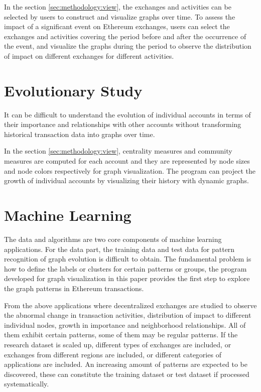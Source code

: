 In the section \ref{sec:methodology:view}, the exchanges and activities can be selected by users to construct and visualize graphs over time. To assess the impact of a significant event on Ethereum exchanges, users can select the exchanges and activities covering the period before and after the occurrence of the event, and visualize the graphs during the period to observe the distribution of impact on different exchanges for different activities. 

\section{Evolutionary Study}
\label{sec:applications:evolutionary}

It can be difficult to understand the evolution of individual accounts in terms of their importance and relationships with other accounts without transforming historical transaction data into graphs over time.

In the section \ref{sec:methodology:view}, centrality measures and community measures are computed for each account and they are represented by node sizes and node colors respectively for graph visualization. The program can project the growth of individual accounts by visualizing their history with dynamic graphs.

\section{Machine Learning}
\label{sec:applications:learning}

The data and algorithms are two core components of machine learning applications. For the data part, the training data and test data for pattern recognition of graph evolution is difficult to obtain. The fundamental problem is how to define the labels or clusters for certain patterns or groups, the program developed for graph visualization in this paper provides the first step to explore the graph patterns in Ethereum transactions.

From the above applications where decentralized exchanges are studied to observe the abnormal change in transaction activities, distribution of impact to different individual nodes, growth in importance and neighborhood relationships. All of them exhibit certain patterns, some of them may be regular patterns. If the research dataset is scaled up, different types of exchanges are included, or exchanges from different regions are included, or different categories of applications are included. An increasing amount of patterns are expected to be discovered, these can constitute the training dataset or test dataset if processed systematically.

